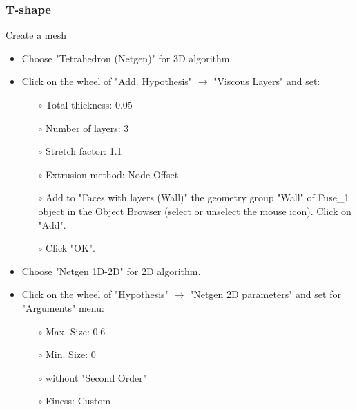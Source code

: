 \documentclass[10pt]{beamer}
\begin{document}
\begin{frame}
\frametitle{T-shape}
\begin{block}{Create a mesh}

\begin{itemize}
\item Choose "Tetrahedron (Netgen)" for 3D algorithm.
\item Click on the wheel of "Add. Hypothesis" $\rightarrow$ "Viscous Layers" and set:
    \begin{itemize}
    \item [$\circ$] Total thickness: 0.05
    \item [$\circ$] Number of layers: 3
    \item [$\circ$] Stretch factor: 1.1
    \item [$\circ$] Extrusion method: Node Offset
    \item [$\circ$] Add to "Faces with layers (Wall)" the geometry group "Wall" of Fuse\_1 object in the Object Browser (select or unselect the mouse icon). Click on "Add".
    \item [$\circ$] Click "OK".
    \end{itemize}
\item Choose "Netgen 1D-2D" for 2D algorithm.
\item Click on the wheel of "Hypothesis" $\rightarrow$ "Netgen 2D parameters" and set for "Arguments" menu:
    \begin{itemize}
    \item [$\circ$] Max. Size: 0.6
    \item [$\circ$] Min. Size: 0
    \item [$\circ$] without "Second Order"
    \item [$\circ$] Finess: Custom
    \end{itemize}

\end{itemize}

\end{block}
\end{frame}
\end{document}
